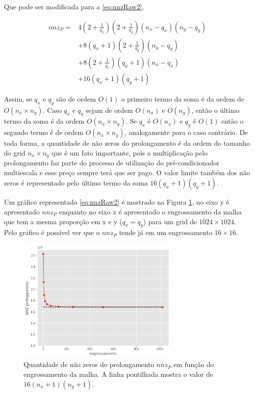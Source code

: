 Que pode ser modificada para a \eqref{eq:nnzRaw2},

\begin{equation} \label{eq:nnzRaw2}
\begin{aligned}
    nnz_P = &   4 (2+\frac{1}{q_x})(2 + \frac{1}{q_y})  (n_x - q_x) (n_y - q_y) \\ 
            & + 8 (q_x+1)(2 + \frac{1}{q_y})  (n_y - q_y) \\
            & + 8 (2+\frac{1}{q_x})(q_y+1) (n_x - q_x) \\
            & + 16 (q_x+1)(q_y+1)  
\end{aligned}
\end{equation}

Assim, se $q_x$ e $q_y$ são de ordem $O(1)$ o primeiro termo da soma é da ordem de $O(n_x \times n_y)$. Caso $q_x$ e $q_y$ sejam de ordem $O(n_x)$ e $O(n_y)$, então o último termo da soma é da ordem $O(n_x \times n_y )$. 
Se $q_x$ é $O(n_x)$ e $q_y$ é $O(1)$ então o segundo termo é de ordem $O(n_x \times n_y)$, analogamente para o caso contrário.
De toda forma, a quantidade de não zeros do prolongamento é da ordem do tamanho do grid $n_x \times n_y$ que é um fato importante, pois a multiplicação pelo prolongamento faz parte do processo de utilização do pré-condicionador multiescala e esse preço sempre terá que ser pago. O valor limite também dos não zeros é representado pelo último termo da soma $16(q_x+1)(q_y+1)$.

Um gráfico representado   \eqref{eq:nnzRaw2} é mostrado na Figura \ref{fig:nnzGrafico}, no eixo y é apresentado $nnz_P$ enquanto no eixo x é apresentado o engrossamento da malha que tem a mesma proporção em x e y ($q_x  = q_y$) para um grid de $1024 \times 1024$. Pelo gráfico é possível ver que o $nnz_P$ tende já em um engrossamento $16 \times 16$.


\begin{figure}[!htbp]
\centering
\includegraphics[width=8cm]{chap06/figs/nnzProlongamento.png}
\caption{Quantidade de não zeros do prolongamento $nnz_P$  em função do engrossamento da malha. A linha pontilhada mostra o valor de $16(n_x+1)(n_y+1)$.}
\label{fig:nnzGrafico}
\end{figure}
